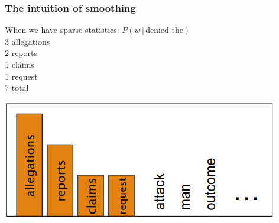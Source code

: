 \documentclass[13.5pt,aspecratio=169]{beamer}
\begin{document}
\begin{frame}
	\frametitle{The intuition of smoothing}
    \begin{minipage}{0.45\textwidth}  %
        \begin{block}{When we have sparse statistics:} %
            \hspace{30pt} $P(w \hspace{2pt} | \hspace{2pt} \text{denied the})$ \\
            \hspace{35pt} 3 allegations \\
            \hspace{35pt} 2 reports \\
            \hspace{35pt} 1 claims \\
            \hspace{35pt} 1 request \\
            \hspace{35pt} 7 total
        \end{block}
    \end{minipage}\hspace{10pt}
    \begin{minipage}{0.45\textwidth}  %
            \centering
            \includegraphics[scale=0.5]{sparse_statistics.png}
    \end{minipage}


\end{frame}
\end{document}
